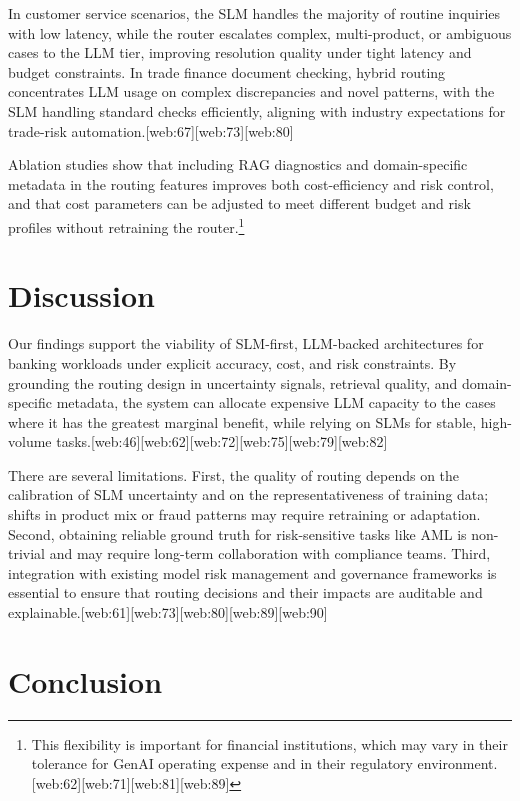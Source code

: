 \documentclass[11pt]{article}
\begin{document}
In customer service scenarios, the SLM handles the majority of routine inquiries with low latency, while the router escalates complex, multi-product, or ambiguous cases to the LLM tier, improving resolution quality under tight latency and budget constraints. In trade finance document checking, hybrid routing concentrates LLM usage on complex discrepancies and novel patterns, with the SLM handling standard checks efficiently, aligning with industry expectations for trade-risk automation.[web:67][web:73][web:80]

Ablation studies show that including RAG diagnostics and domain-specific metadata in the routing features improves both cost-efficiency and risk control, and that cost parameters can be adjusted to meet different budget and risk profiles without retraining the router.\footnote{This flexibility is important for financial institutions, which may vary in their tolerance for GenAI operating expense and in their regulatory environment.[web:62][web:71][web:81][web:89]}

\section{Discussion}

Our findings support the viability of SLM-first, LLM-backed architectures for banking workloads under explicit accuracy, cost, and risk constraints. By grounding the routing design in uncertainty signals, retrieval quality, and domain-specific metadata, the system can allocate expensive LLM capacity to the cases where it has the greatest marginal benefit, while relying on SLMs for stable, high-volume tasks.[web:46][web:62][web:72][web:75][web:79][web:82]

There are several limitations. First, the quality of routing depends on the calibration of SLM uncertainty and on the representativeness of training data; shifts in product mix or fraud patterns may require retraining or adaptation. Second, obtaining reliable ground truth for risk-sensitive tasks like AML is non-trivial and may require long-term collaboration with compliance teams. Third, integration with existing model risk management and governance frameworks is essential to ensure that routing decisions and their impacts are auditable and explainable.[web:61][web:73][web:80][web:89][web:90]

\section{Conclusion}
\end{document}
